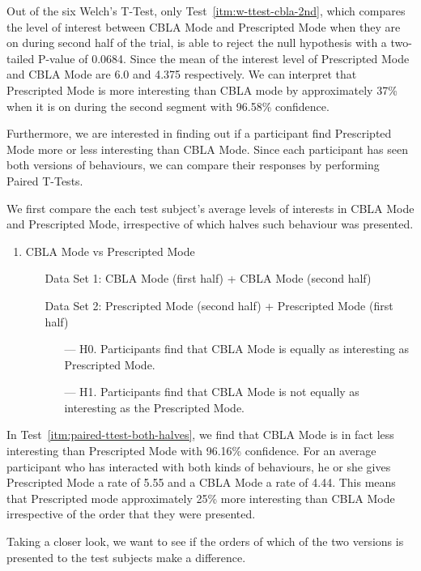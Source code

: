 Out of the six Welch's T-Test, only Test~\ref{itm:w-ttest-cbla-2nd}, which compares the level of interest between CBLA Mode and Prescripted Mode when they are on during second half of the trial, is able to reject the null hypothesis with a two-tailed P-value of 0.0684. Since the mean of the interest level of Prescripted Mode and CBLA Mode are 6.0 and 4.375 respectively. We can interpret that Prescripted Mode is more interesting than CBLA mode by approximately 37\% when it is on during the second segment with 96.58\% confidence. 

Furthermore, we are interested in finding out if a participant find Prescripted Mode more or less interesting than CBLA Mode. Since each participant has seen both versions of behaviours, we can compare their responses by performing Paired T-Tests. 

We first compare the each test subject's average levels of interests in CBLA Mode and Prescripted Mode, irrespective of which halves such behaviour was presented. 
\begin{enumerate}[resume]
 	\item CBLA Mode vs Prescripted Mode
 	\begin{itemize}[align=left]\label{itm:paired-ttest-both-halves}
 		\item[Data Set 1: ]  CBLA Mode (first half) + CBLA Mode (second half)
 		\item[Data Set 2: ]  Prescripted Mode (second half) + Prescripted Mode (first half) 
 		\begin{itemize}
 			\item[--- H0.] Participants find that CBLA Mode is equally as interesting as Prescripted Mode.
 			\item[--- H1.] Participants find that CBLA Mode is not equally as interesting as the Prescripted Mode.
 		\end{itemize}
 	\end{itemize}
\end{enumerate}

In Test~\ref{itm:paired-ttest-both-halves}, we find that CBLA Mode is in fact less interesting than Prescripted Mode with 96.16\% confidence. For an average participant who has interacted with both kinds of behaviours, he or she gives Prescripted Mode a rate of 5.55 and a CBLA Mode a rate of 4.44. This means that Prescripted mode approximately 25\% more interesting than CBLA Mode irrespective of the order that they were presented. 

Taking a closer look, we want to see if the orders of which of the two versions is presented to the test subjects make a difference.

